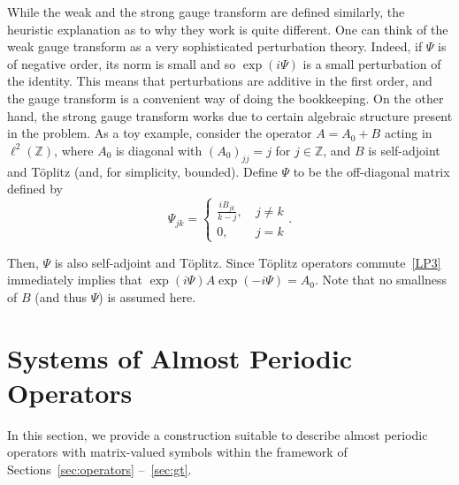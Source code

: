 \documentclass[AHL,Unicode,longabstracts,published]{cedram}
\newcommand{\Z}{\mathbb Z}
\begin{document}
\begin{rema}
While the weak and the strong gauge transform are defined similarly, the heuristic explanation as to why they work is quite different. One can think of the weak gauge transform as a very sophisticated perturbation theory. Indeed, if $\Psi$ is of negative order, its norm is small and so $\exp(i\Psi)$ is a small perturbation of the identity. This means that perturbations are additive in the first order, and the gauge transform is a convenient way of doing the bookkeeping. On the other hand, the strong gauge transform works due to certain algebraic structure present in the problem. As a toy example, consider the operator $A=A_0+B$ acting in $\ell^2(\Z)$, where $A_0$ is diagonal with $(A_0)_{jj}=j$ for $j\in\Z$, and $B$ is self-adjoint and T\"oplitz (and, for simplicity, bounded). Define $\Psi$ to be the off-diagonal matrix defined by
\[
\Psi_{jk}=
\begin{cases}\frac{iB_{jk}}{k - j},& \ j \ne k\\
0,& \ j= k
\end{cases}.
\]

Then, $\Psi$ is also self-adjoint and T\"oplitz. Since T\"oplitz operators commute~\eqref{LP3} immediately implies that $\exp(i\Psi)A\exp(-i\Psi)=A_0$. Note that no smallness of $B$ (and thus $\Psi$) is assumed here.
\end{rema}

\section{Systems of Almost Periodic Operators} \label{sec:mapo}

In this section, we provide a construction suitable to describe almost periodic operators with matrix-valued symbols within the framework of Sections~\ref{sec:operators} --~\ref{sec:gt}.
\end{document}
